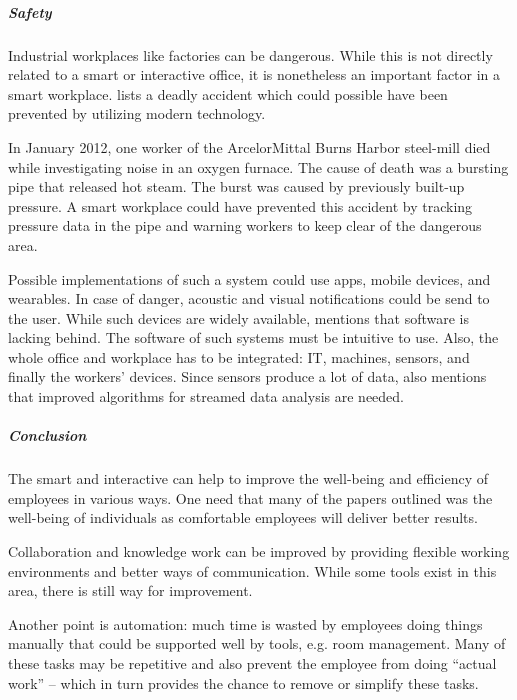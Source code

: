\subparagraph{Safety}\label{sec:sda-safety}
Industrial workplaces like factories can be dangerous. While this is not directly related to a smart 
or interactive office, it is nonetheless an important factor in a smart workplace. \cite{sda-wired} 
lists a deadly accident which could possible have been prevented by utilizing modern technology.

In January 2012, one worker of the ArcelorMittal Burns Harbor steel-mill died while investigating 
noise in an oxygen furnace. The cause of death was a bursting pipe that released hot steam. The 
burst was caused by previously built-up pressure. A smart workplace could have prevented this 
accident by tracking pressure data in the pipe and warning workers to keep clear of the dangerous 
area.

Possible implementations of such a system could use apps, mobile devices, and wearables. In case of 
danger, acoustic and visual notifications could be send to the user. While such devices are widely 
available, \cite{sda-wired} mentions that software is lacking behind. The software of such systems 
must be intuitive to use. Also, the whole office and workplace has to be integrated: IT, machines, 
sensors, and finally the workers' devices. Since sensors produce a lot of data, \cite{sda-wired} 
also mentions that improved algorithms for streamed data analysis are needed.


\subparagraph{Conclusion}
The smart and interactive can help to improve the well-being and efficiency of employees in various 
ways. One need that many of the papers outlined was the well-being of individuals as comfortable 
employees will deliver better results.

Collaboration and knowledge work can be improved by providing flexible working environments and 
better ways of communication. While some tools exist in this area, there is still way for 
improvement. 

Another point is automation: much time is wasted by employees doing things manually that could be 
supported well by tools, e.g. room management. Many of these tasks may be repetitive and also 
prevent the employee from doing ``actual work'' -- which in turn provides the chance to remove or 
simplify these tasks.
